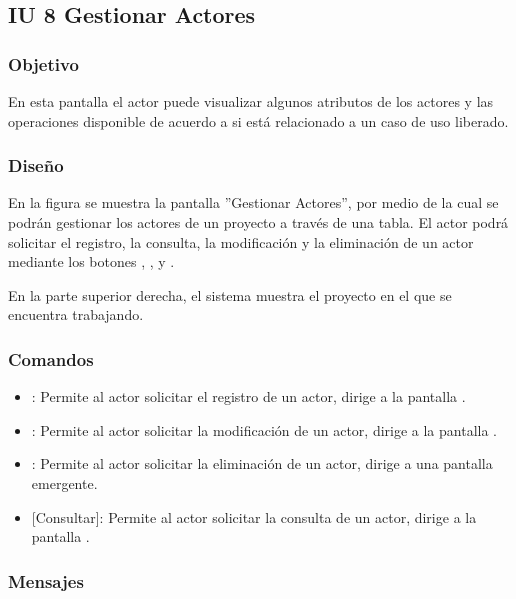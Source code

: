 \subsection{IU 8 Gestionar Actores}

\subsubsection{Objetivo}
	En esta pantalla el actor puede visualizar algunos atributos de los actores y las operaciones disponible de acuerdo a si está relacionado a un caso de uso liberado.
\subsubsection{Diseño}
	En la figura  se muestra la pantalla ''Gestionar Actores'', por medio de la cual se podrán gestionar los actores de un proyecto a través de una tabla. El actor podrá solicitar el registro, la consulta, la modificación y la eliminación de un actor mediante los botones , , \editar y \eliminar.
	
	En la parte superior derecha, el sistema muestra el proyecto en el que se encuentra trabajando.

\subsubsection{Comandos}
\begin{itemize}
	\item {}: Permite al actor solicitar el registro de un actor, dirige a la pantalla .
	\item \editar [Modificar]: Permite al actor solicitar la modificación de un actor, dirige a la pantalla .
	\item \eliminar [Eliminar]: Permite al actor solicitar la eliminación de un actor, dirige a una pantalla emergente.
	\item {} [Consultar]: Permite al actor solicitar la consulta de un actor, dirige a la pantalla  .
\end{itemize}
\subsubsection{Mensajes}

